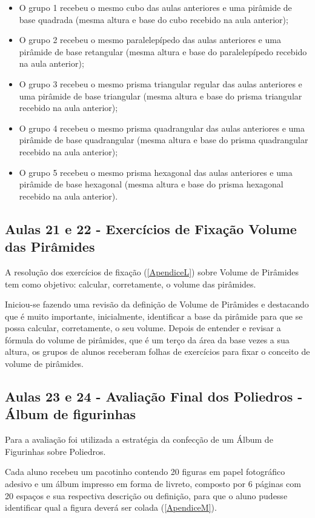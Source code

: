 \begin{itemize}
    \item O grupo 1 recebeu o mesmo cubo das aulas anteriores e uma pirâmide de base quadrada (mesma altura e base do cubo recebido na aula anterior);
    \item O grupo 2 recebeu o mesmo paralelepípedo das aulas anteriores e uma pirâmide de base retangular (mesma altura e base do paralelepípedo recebido na aula anterior);
    \item O grupo 3 recebeu o mesmo prisma triangular regular das aulas anteriores e uma pirâmide de base triangular (mesma altura e base do prisma triangular recebido na aula anterior);
    \item O grupo 4 recebeu o mesmo prisma quadrangular das aulas anteriores e uma pirâmide de base quadrangular (mesma altura e base do prisma quadrangular recebido na aula anterior);
    \item O grupo 5 recebeu o mesmo prisma hexagonal das aulas anteriores e uma pirâmide de base hexagonal (mesma altura e base do prisma hexagonal recebido na aula anterior).
\end{itemize}

\subsection{Aulas 21 e 22 - Exercícios de Fixação Volume das Pirâmides}

A resolução dos exercícios de fixação (\autoref{ApendiceL}) sobre Volume de Pirâmides tem como objetivo: calcular, corretamente, o volume das pirâmides.

Iniciou-se fazendo uma revisão da definição de Volume de Pirâmides e destacando que é muito importante, inicialmente, identificar a base da pirâmide para que se possa calcular, corretamente, o seu volume. Depois de entender e revisar a fórmula do volume de pirâmides, que é um terço da área da base vezes a sua altura, os grupos de alunos receberam folhas de exercícios para fixar o conceito de volume de pirâmides.

\subsection{Aulas 23 e 24 - Avaliação Final dos Poliedros - Álbum de figurinhas}

Para a avaliação foi utilizada a estratégia da confecção de um Álbum de Figurinhas sobre Poliedros.

Cada aluno recebeu um pacotinho contendo 20 figuras em papel fotográfico adesivo e um álbum impresso em forma de livreto, composto por 6 páginas com 20 espaços e sua respectiva descrição ou definição, para que o aluno pudesse identificar qual a figura deverá ser colada (\autoref{ApendiceM}).

